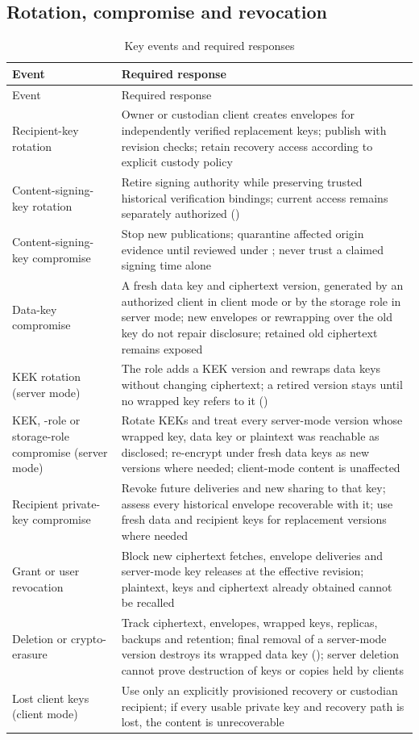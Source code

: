 \subsection{Rotation, compromise and revocation}
\begin{longtable}{@{}P{0.24\textwidth}P{0.66\textwidth}@{}}
\caption{Key events and required responses}\label{tab:rotation}\\
\toprule Event & Required response\\\midrule\endfirsthead
\toprule Event & Required response\\\midrule\endhead
Recipient-key rotation & Owner or custodian client creates envelopes for independently verified replacement keys; publish with revision checks; retain recovery access according to explicit custody policy\\
Content-signing-key rotation & Retire signing authority while preserving trusted historical verification bindings; current access remains separately authorized ()\\
Content-signing-key compromise & Stop new publications; quarantine affected origin evidence until reviewed under ; never trust a claimed signing time alone\\
Data-key compromise & A fresh data key and ciphertext version, generated by an authorized client in client mode or by the storage role in server mode; new envelopes or rewrapping over the old key do not repair disclosure; retained old ciphertext remains exposed\\
KEK rotation (server mode) & The  role adds a KEK version and rewraps data keys without changing ciphertext; a retired version stays until no wrapped key refers to it ()\\
KEK, -role or storage-role compromise (server mode) & Rotate KEKs and treat every server-mode version whose wrapped key, data key or plaintext was reachable as disclosed; re-encrypt under fresh data keys as new versions where needed; client-mode content is unaffected\\
Recipient private-key compromise & Revoke future deliveries and new sharing to that key; assess every historical envelope recoverable with it; use fresh data and recipient keys for replacement versions where needed\\
Grant or user revocation & Block new ciphertext fetches, envelope deliveries and server-mode key releases at the effective revision; plaintext, keys and ciphertext already obtained cannot be recalled\\
Deletion or crypto-erasure & Track ciphertext, envelopes, wrapped keys, replicas, backups and retention; final removal of a server-mode version destroys its wrapped data key (); server deletion cannot prove destruction of keys or copies held by clients\\
Lost client keys (client mode) & Use only an explicitly provisioned recovery or custodian recipient; if every usable private key and recovery path is lost, the content is unrecoverable\\
\bottomrule
\end{longtable}

